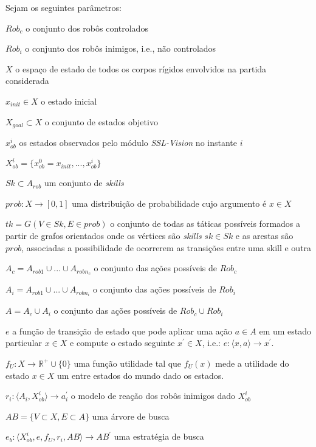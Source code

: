 \begin{defi}[Time]\label{def:time}
  Sejam os seguintes parâmetros: 

  \begin{description}
    \item $Rob_c$ o conjunto dos robôs controlados
    \item $Rob_i$ o conjunto dos robôs inimigos, i.e., não controlados
    \item $X$ o espaço de estado de todos os corpos rígidos envolvidos na partida considerada
    \item $x_{init} \in X$ o estado inicial
    \item $X_{goal}\subset X$ o conjunto de estados objetivo
    \item $x_{ob}^{i}$ os estados observados pelo módulo \textit{SSL-Vision} no instante $i$
    \item $X_{ob}^{i} =  \lbrace{x_{ob}^{0} = x_{init},...,x_{ob}^{i}}\rbrace$
    \item $Sk \subset A_{rob}$ um conjunto de \textit{skills}
    \item $prob: X \longrightarrow [0,1]$ uma distribuição de probabilidade cujo argumento é
          $x \in X$
    \item $tk = G(V \in Sk, E \in {prob} )$ o conjunto de todas as táticas possíveis
          formados a partir de grafos orientados onde os vértices são \textit{skills} $sk \in Sk$
          e as arestas são $prob$, associadas a possibilidade de ocorrerem as transições
          entre uma skill e outra
    \item $A_c = A_{rob 1} \cup ... \cup A_{rob n_c}$ o conjunto das ações possíveis de $Rob_c$
    \item $A_i = A_{rob 1} \cup ... \cup A_{rob n_i}$ o conjunto das ações possíveis de $Rob_i$
    \item $A = A_c \cup A_i$ o conjunto das ações possíveis de $Rob_c \cup Rob_i$
    \item $e$ a função de transição de estado que pode aplicar uma ação $a\in A$ em um estado particular
          $x \in X$ e compute o estado seguinte $x^{'} \in X$, i.e.:
          $e: \langle x,a \rangle \longrightarrow x^{'}$.
    \item $f_{U}: X \longrightarrow \mathbb{R^{+}} \cup\lbrace 0\rbrace$ uma função utilidade tal que
          $f_{U}(x)$ mede a utilidade do estado $x \in X$ um entre estados do mundo dado os estados.
    \item $r_i: \langle A_i, X_{ob}^{i}\rangle \longrightarrow a_i^{'}$ o modelo de reação dos robôs
          inimigos dado $X_{ob}^{i}$
    \item $AB =\lbrace V \subset X, E \subset A\rbrace$ uma árvore de busca
    \item $e_b: \langle X_{ob}^{i}, e, f_{U}, r_i, AB\rangle \longrightarrow AB^{'}$ uma estratégia de busca
    

\end{description}
\end{defi}
